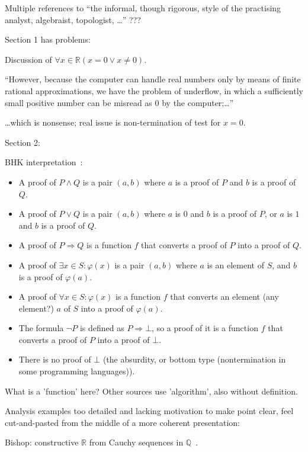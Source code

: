Multiple references to ``the informal, though rigorous, 
style of the practising analyst, algebraist, topologist, \ldots''
???

Section 1 has problems:

Discussion of
$ \forall x \in \mathbb{R} (x = 0 \vee x \ne 0)$.

``However, because the computer can handle real numbers 
only by means of finite rational approximations, 
we have the problem of underflow, 
in which a sufficiently small positive number can be misread as 0 
by the computer;\ldots''

\ldots which is nonsense;
real issue is non-termination of test for $x=0$.

Section 2:

BHK interpretation~\cite{wiki:Brouwer_Heyting_Kolmogorov_interpretation}:
\begin{itemize}
  \item A proof of $P\wedge Q$ 
  is a pair $(a,b)$ where $a$ is a proof of $P$ 
  and $b$ is a proof of $Q$.
\item A proof of $P\vee Q$ is a pair $(a,b)$ 
where $a$ is $0$ and 
$b$ is a proof of $P$, 
or $a$ is $1$ 
and $b$ is a proof of $Q$.
\item A proof of $P\Rightarrow Q$ is 
a function $f$ that converts 
a proof of $P$ into a proof of $Q$.
\item A proof of $\exists x\in S:\varphi (x)$ is 
a pair $(a,b)$ where 
$a$ is an element of $S$, 
and $b$ is a proof of $\varphi (a)$.
\item A proof of $\forall x\in S:\varphi (x)$ is 
a function $f$ that converts 
an element (any element?) $a$ of $S$ into a proof of $\varphi (a)$.
\item The formula $\neg P$ is defined as $P\Rightarrow \bot$, 
so a proof of it is a function $f$ that converts 
a proof of $P$ into a proof of $\bot$.
\item There is no proof of $\bot$
(the absurdity, or bottom type 
(nontermination in some programming languages)).
\end{itemize}
What is a 'function' here? 
Other sources use 'algorithm', also without definition.

Analysis examples too detailed and lacking motivation 
to make point clear, feel cut-and-pasted from the middle
of a more coherent presentation:

Bishop: constructive $\mathbb{R}$ 
from Cauchy sequences 
in $\mathbb{Q}$~\cite{bishop1985constructive}.

